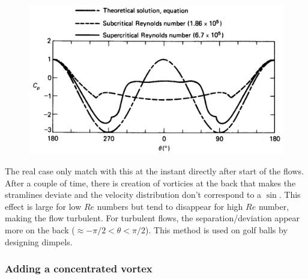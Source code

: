 		\begin{figure}
	\vspace{-5mm}	
	\includegraphics[scale=0.25]{ch3/12}	
	\end{figure}
	The real case only match with this at the instant directly after start of the flows. After a couple of time, there is creation of vorticies at the back that makes the stramlines deviate and the velocity distribution don't correspond to a $\sin$. This effect is large for low $Re$ numbers but tend to disappear for high $Re$ number, making the flow turbulent. For turbulent flows, the separation/deviation appear more on the back ($\approx -\pi/2 < \theta < \pi /2$). This method is used on golf balls by designing dimpels. 
		
	\subsubsection{Adding a concentrated vortex}
		
